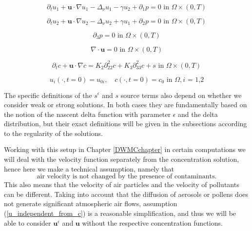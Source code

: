 \documentclass[12pt]{report}
\numberwithin{theorem}{chapter}
\numberwithin{corollary}{chapter}
\numberwithin{lemma}{chapter}
\numberwithin{remark}{chapter}
\numberwithin{definition}{chapter}
\numberwithin{prop}{chapter}
\begin{document}
\begin{equation} \label{HNSC1_coordinates_DWMC_intro}    
  \partial_t u_1 + \mathbf{u} \cdot \nabla u_1 - \Delta_\nu u_1 -\gamma u_2 + \partial_1 p = 0 \text{ in } \Omega \times (0,T)
\end{equation}

\begin{equation} \label{HNSC2_coordinates_DWMC_intro}   
  \partial_t u_2 + \mathbf{u} \cdot \nabla u_2 - \Delta_\nu u_2 + \gamma u_1 + \partial_2 p = 0 \text{ in } \Omega \times (0,T)
\end{equation}

\begin{equation} \label{HNSC3_coordinates_DWMC_intro}   
  \partial_3 p = 0 \text{ in } \Omega \times (0,T)
\end{equation}

\begin{equation} \label{HNSC4_coordinates_DWMC_intro}   
  \nabla \cdot \mathbf{u} = 0 \text{ in } \Omega \times (0,T)
\end{equation}

\begin{equation} \label{HNSC5_coordinates_DWMC_intro}   
  \partial_t c + \mathbf{u} \cdot \nabla c = K_2 \partial_{22} ^ 2 c + K_3 \partial_{33} ^2 c + s \text{ in } \Omega \times (0,T)
\end{equation}

\begin{equation} \label{HNSC_init_coordinates_DWMC_intro}
  u_i (\cdot, t=0) = u_{0 i}, \quad c (\cdot, t=0) = c_0 \text{ in } \Omega, \text{$i$ = 1,2}
\end{equation}

The specific definitions of the $s^\epsilon$ and $s$ source terms also depend on whether we consider weak or strong solutions. In both cases they are fundamentally based on the notion of the nascent delta function with parameter $\epsilon$ and the delta distribution, but their exact definitions will be given in the subsections according to the regularity of the solutions.

Working with this setup in Chapter \ref{DWMCchapter} in certain computations we will deal with the velocity function separately from the concentration solution, hence here we make a technical assumption, namely that
\begin{equation}\label{u_independent_from_c}\text{air velocity is not changed by the presence of contaminants.}\end{equation}
This also means that the velocity of air particles and the velocity of pollutants can be different. Taking into account that the diffusion of aerosols or pollens does not generate significant atmospheric air flows, assumption (\ref{u_independent_from_c}) is a reasonable simplification, and thus we will be able to consider $\mathbf{u}^\epsilon$ and $\mathbf{u}$ without the respective concentration functions.
\end{document}
